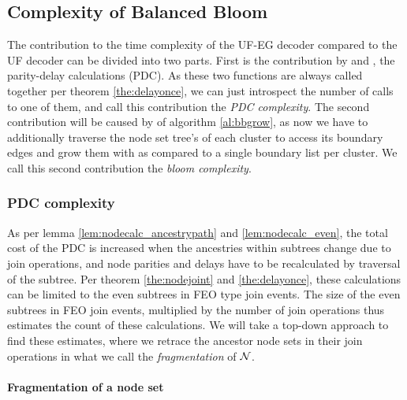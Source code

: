 \subsection{Complexity of Balanced Bloom}\label{sec:ufbbcomplexity}

The contribution to the time complexity of the UF-EG decoder compared to the UF decoder can be divided into two parts. First is the contribution by  and , the parity-delay calculations (PDC). As these two functions are always called together per theorem \ref{the:delayonce}, we can just introspect the number of calls to one of them, and call this contribution the \emph{PDC complexity}. The second contribution will be caused by  of algorithm \ref{al:bbgrow}, as now we have to additionally traverse the node set tree's of each cluster to access its boundary edges and grow them with  as compared to a single boundary list per cluster. We call this second contribution the \emph{bloom complexity}.

\subsubsection{PDC complexity}
As per lemma \ref{lem:nodecalc_ancestrypath} and \ref{lem:nodecalc_even}, the total cost of the PDC is increased when the ancestries within subtrees change due to join operations, and node parities and delays have to be recalculated by traversal of the subtree. Per theorem \ref{the:nodejoint} and \ref{the:delayonce}, these calculations can be limited to the even subtrees in FEO type join events. The size of the even subtrees in FEO join events, multiplied by the number of join operations thus estimates the count of these calculations. We will take a top-down approach to find these estimates, where we retrace the ancestor node sets in their join operations in what we call the \emph{fragmentation} of $\mathcal{N}$.

\paragraph{Fragmentation of a node set}

